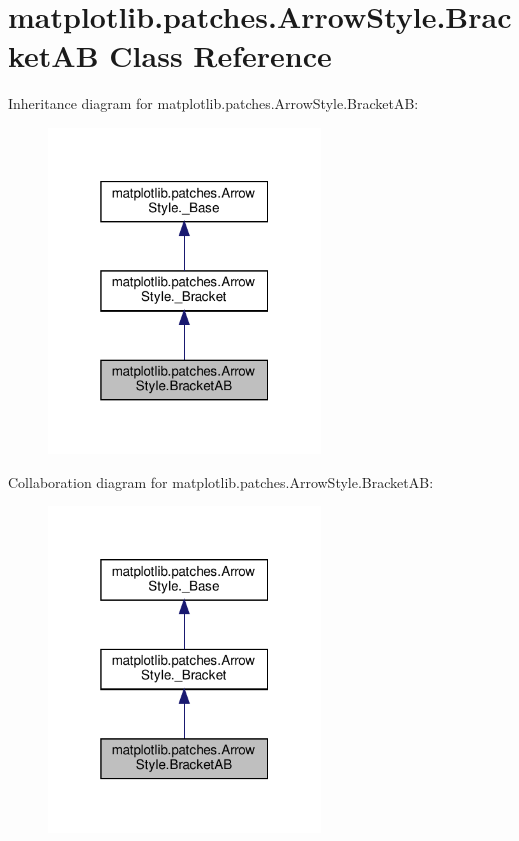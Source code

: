 \hypertarget{classmatplotlib_1_1patches_1_1ArrowStyle_1_1BracketAB}{}\section{matplotlib.\+patches.\+Arrow\+Style.\+Bracket\+AB Class Reference}
\label{classmatplotlib_1_1patches_1_1ArrowStyle_1_1BracketAB}


Inheritance diagram for matplotlib.\+patches.\+Arrow\+Style.\+Bracket\+AB\+:
\nopagebreak
\begin{figure}[H]
\begin{center}
\leavevmode
\includegraphics[width=205pt]{classmatplotlib_1_1patches_1_1ArrowStyle_1_1BracketAB__inherit__graph}
\end{center}
\end{figure}


Collaboration diagram for matplotlib.\+patches.\+Arrow\+Style.\+Bracket\+AB\+:
\nopagebreak
\begin{figure}[H]
\begin{center}
\leavevmode
\includegraphics[width=205pt]{classmatplotlib_1_1patches_1_1ArrowStyle_1_1BracketAB__coll__graph}
\end{center}
\end{figure}
